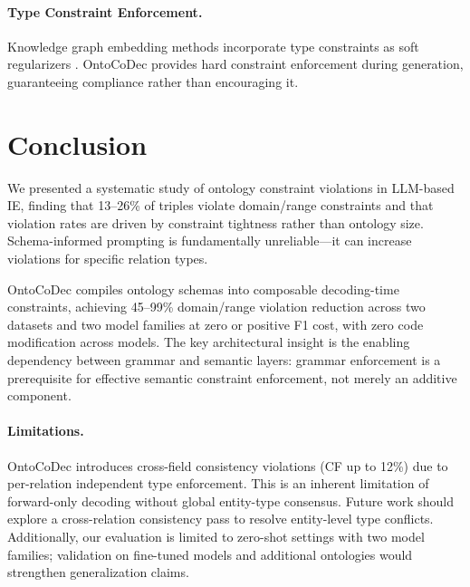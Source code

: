 \documentclass[11pt,a4paper]{article}
\newcommand{\sys}{OntoCoDec}
\begin{document}
\paragraph{Type Constraint Enforcement.}
Knowledge graph embedding methods incorporate type constraints as soft regularizers \cite{Krompass2015TypeKG}.
\sys{} provides hard constraint enforcement during generation, guaranteeing compliance rather than encouraging it.

\section{Conclusion}

We presented a systematic study of ontology constraint violations in LLM-based IE, finding that 13--26\% of triples violate domain/range constraints and that violation rates are driven by constraint tightness rather than ontology size.
Schema-informed prompting is fundamentally unreliable---it can increase violations for specific relation types.

\sys{} compiles ontology schemas into composable decoding-time constraints, achieving 45--99\% domain/range violation reduction across two datasets and two model families at zero or positive F1 cost, with zero code modification across models.
The key architectural insight is the enabling dependency between grammar and semantic layers: grammar enforcement is a prerequisite for effective semantic constraint enforcement, not merely an additive component.

\paragraph{Limitations.}
\sys{} introduces cross-field consistency violations (CF up to 12\%) due to per-relation independent type enforcement.
This is an inherent limitation of forward-only decoding without global entity-type consensus.
Future work should explore a cross-relation consistency pass to resolve entity-level type conflicts.
Additionally, our evaluation is limited to zero-shot settings with two model families; validation on fine-tuned models and additional ontologies would strengthen generalization claims.
\end{document}
